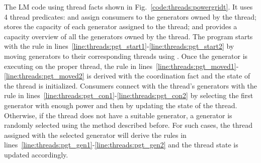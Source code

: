 The LM code using thread facts shown in Fig.~\ref{code:threads:powergridt}. It uses
4 thread predicates:  and
 assign consumers to the generators owned by the
thread;  stores the capacity of each generator assigned to
the thread; and  provides a capacity overview of all
the generators owned by the thread.  The program starts with the rule in
lines~\ref{line:threads:pgt_start1}-\ref{line:threads:pgt_start2} by moving
generators to their corresponding threads using . Once the
generator is executing on the proper thread, the rule in
lines~\ref{line:threads:pgt_moved1}-\ref{line:threads:pgt_moved2} is derived
with the  coordination fact and the state of the thread is
initialized. Consumers connect with the thread's generators with the rule in
lines~\ref{line:threads:pgt_con1}-\ref{line:threads:pgt_con2} by selecting the
first generator with enough power and then by updating the state of the thread.
Otherwise, if the thread does not have a suitable generator, a generator is
randomly selected using the method described before. For such cases, the thread
assigned with the selected generator will derive the rules in
lines~\ref{line:threads:pgt_gen1}-\ref{line:threads:pgt_gen2} and the thread
state is updated accordingly.

